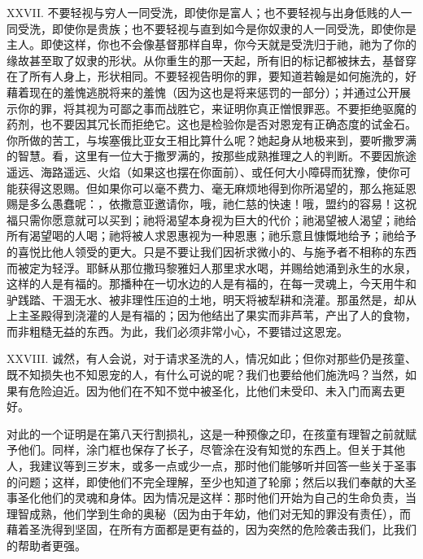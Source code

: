 XXVII. 不要轻视与穷人一同受洗，即使你是富人；也不要轻视与出身低贱的人一同受洗，即使你是贵族；也不要轻视与直到如今是你奴隶的人一同受洗，即使你是主人。即使这样，你也不会像基督那样自卑，你今天就是受洗归于祂，祂为了你的缘故甚至取了奴隶的形状。从你重生的那一天起，所有旧的标记都被抹去，基督穿在了所有人身上，形状相同。不要轻视告明你的罪，要知道若翰是如何施洗的，好藉着现在的羞愧逃脱将来的羞愧（因为这也是将来惩罚的一部分）；并通过公开展示你的罪，将其视为可鄙之事而战胜它，来证明你真正憎恨罪恶。不要拒绝驱魔的药剂，也不要因其冗长而拒绝它。这也是检验你是否对恩宠有正确态度的试金石。你所做的苦工，与埃塞俄比亚女王相比算什么呢？她起身从地极来到，要听撒罗满的智慧。看，这里有一位大于撒罗满的，按那些成熟推理之人的判断。不要因旅途遥远、海路遥远、火焰（如果这也摆在你面前）、或任何大小障碍而犹豫，使你可能获得这恩赐。但如果你可以毫不费力、毫无麻烦地得到你所渴望的，那么拖延恩赐是多么愚蠢呢：，依撒意亚邀请你，哦，祂仁慈的快速！哦，盟约的容易！这祝福只需你愿意就可以买到；祂将渴望本身视为巨大的代价；祂渴望被人渴望；祂给所有渴望喝的人喝；祂将被人求恩惠视为一种恩惠；祂乐意且慷慨地给予；祂给予的喜悦比他人领受的更大。只是不要让我们因祈求微小的、与施予者不相称的东西而被定为轻浮。耶稣从那位撒玛黎雅妇人那里求水喝，并赐给她涌到永生的水泉，这样的人是有福的。那播种在一切水边的人是有福的，在每一灵魂上，今天用牛和驴践踏、干涸无水、被非理性压迫的土地，明天将被犁耕和浇灌。那虽然是，却从上主圣殿得到浇灌的人是有福的；因为他结出了果实而非芦苇，产出了人的食物，而非粗糙无益的东西。为此，我们必须非常小心，不要错过这恩宠。\par

XXVIII. 诚然，有人会说，对于请求圣洗的人，情况如此；但你对那些仍是孩童、既不知损失也不知恩宠的人，有什么可说的呢？我们也要给他们施洗吗？当然，如果有危险迫近。因为他们在不知不觉中被圣化，比他们未受印、未入门而离去更好。\par

对此的一个证明是在第八天行割损礼，这是一种预像之印，在孩童有理智之前就赋予他们。同样，涂门框也保存了长子，尽管涂在没有知觉的东西上。但关于其他人，我建议等到三岁末，或多一点或少一点，那时他们能够听并回答一些关于圣事的问题；这样，即使他们不完全理解，至少也知道了轮廓；然后以我们奉献的大圣事圣化他们的灵魂和身体。因为情况是这样：那时他们开始为自己的生命负责，当理智成熟，他们学到生命的奥秘（因为由于年幼，他们对无知的罪没有责任），而藉着圣洗得到坚固，在所有方面都是更有益的，因为突然的危险袭击我们，比我们的帮助者更强。\par

